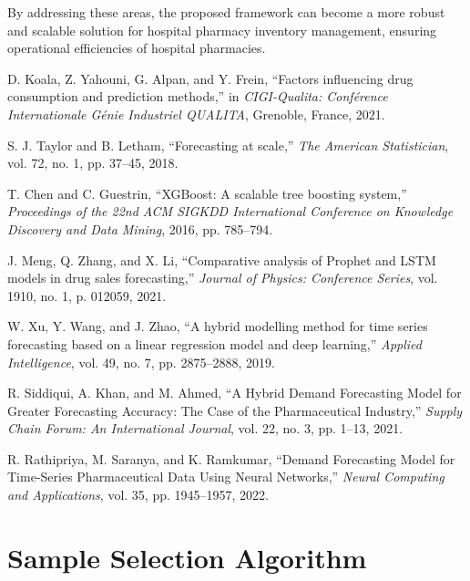 \documentclass[journal]{IEEEtran}
\begin{document}
By addressing these areas, the proposed framework can become a more robust and scalable solution for hospital pharmacy inventory management, ensuring operational efficiencies of hospital pharmacies.

\begin{thebibliography}{99}

    D. Koala, Z. Yahouni, G. Alpan, and Y. Frein, “Factors influencing drug consumption and prediction methods,” in \textit{CIGI-Qualita: Conférence Internationale Génie Industriel QUALITA}, Grenoble, France, 2021.
    
    S. J. Taylor and B. Letham, “Forecasting at scale,” \textit{The American Statistician}, vol. 72, no. 1, pp. 37–45, 2018.

    T. Chen and C. Guestrin, “XGBoost: A scalable tree boosting system,” \textit{Proceedings of the 22nd ACM SIGKDD International Conference on Knowledge Discovery and Data Mining}, 2016, pp. 785–794.

    J. Meng, Q. Zhang, and X. Li, “Comparative analysis of Prophet and LSTM models in drug sales forecasting,” \textit{Journal of Physics: Conference Series}, vol. 1910, no. 1, p. 012059, 2021.

    W. Xu, Y. Wang, and J. Zhao, “A hybrid modelling method for time series forecasting based on a linear regression model and deep learning,” \textit{Applied Intelligence}, vol. 49, no. 7, pp. 2875–2888, 2019.

    R. Siddiqui, A. Khan, and M. Ahmed, “A Hybrid Demand Forecasting Model for Greater Forecasting Accuracy: The Case of the Pharmaceutical Industry,” \textit{Supply Chain Forum: An International Journal}, vol. 22, no. 3, pp. 1–13, 2021.

    R. Rathipriya, M. Saranya, and K. Ramkumar, “Demand Forecasting Model for Time-Series Pharmaceutical Data Using Neural Networks,” \textit{Neural Computing and Applications}, vol. 35, pp. 1945–1957, 2022.

\end{thebibliography}

\raggedbottom  %

\appendix
\section{Sample Selection Algorithm}
\label{appendix:sample-selection}
\end{document}
